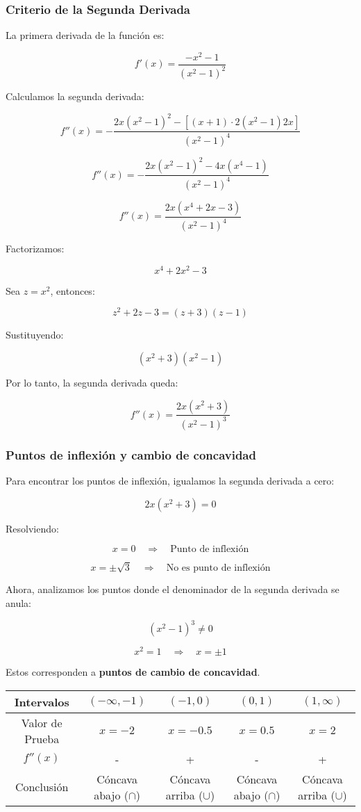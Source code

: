 \subsubsection*{Criterio de la Segunda Derivada}

La primera derivada de la función es:

\[
f'(x) = \frac{-x^2 -1}{(x^2 - 1)^2}
\]

Calculamos la segunda derivada:

\[
f''(x) = - \frac{2x (x^2 -1)^2 - \left[ (x+1) \cdot 2 (x^2 -1) 2x \right]}{(x^2 -1)^4}
\]

\[
f''(x) = - \frac{2x (x^2-1)^2 - 4x (x^4 -1)}{(x^2 -1)^4}
\]

\[
f''(x) = \frac{2x(x^4 + 2x -3)}{(x^2 - 1)^4}
\]

Factorizamos:

\[
x^4 + 2x^2 -3
\]

Sea \( z = x^2 \), entonces:

\[
z^2 + 2z -3 = (z+3)(z-1)
\]

Sustituyendo:

\[
(x^2+3)(x^2-1)
\]

Por lo tanto, la segunda derivada queda:

\[
f''(x) = \frac{2x (x^2+3)}{(x^2 -1)^3}
\]

\subsubsection*{Puntos de inflexión y cambio de concavidad}

Para encontrar los puntos de inflexión, igualamos la segunda derivada a cero:

\[
2x(x^2+3) = 0
\]

Resolviendo:

\[
x = 0 \quad \Rightarrow \quad \text{Punto de inflexión}
\]

\[
x = \pm \sqrt{3} \quad \Rightarrow \quad \text{No es punto de inflexión}
\]

Ahora, analizamos los puntos donde el denominador de la segunda derivada se anula:

\[
(x^2 -1)^3 \neq 0
\]

\[
x^2 = 1 \quad \Rightarrow \quad x = \pm 1
\]

Estos corresponden a \textbf{puntos de cambio de concavidad}.

\begin{center}
    \begin{tabular}{|c|c|c|c|c|}
        \hline
        Intervalos & $(-\infty,-1)$ & $(-1,0)$ & $(0,1)$ & $(1,\infty)$ \\
        \hline
        Valor de Prueba & $x=-2$ & $x=-0.5$ & $x=0.5$ & $x=2$ \\
        \hline
        $f''(x)$ & - & + & - & + \\
        \hline
        Conclusión & Cóncava abajo ($\cap$) & Cóncava arriba ($\cup$) & Cóncava abajo ($\cap$) & Cóncava  arriba ($\cup$) \\
        \hline
    \end{tabular}
\end{center}

